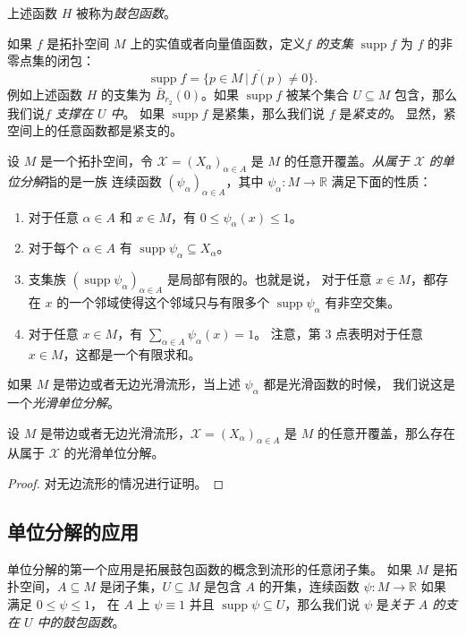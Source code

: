 \documentclass[fontset=none]{Notes}
\DeclareMathOperator\supp{supp}
\begin{document}
上述函数 $H$ 被称为\emph{鼓包函数}。

如果 $f$ 是拓扑空间 $M$ 上的实值或者向量值函数，定义\emph{$f$ 的支集}
$\supp f$ 为 $f$ 的非零点集的闭包：
\[
  \supp f=\overline{\{p\in M\,|\, f(p)\neq 0\}}  .
\]
例如上述函数 $H$ 的支集为 $\bar B_{r_2}(0)$。如果 $\supp f$
被某个集合 $U\subseteq M$ 包含，那么我们说\emph{$f$ 支撑在 $U$ 中}。
如果 $\supp f$ 是紧集，那么我们说 $f$ 是\emph{紧支的}。
显然，紧空间上的任意函数都是紧支的。

设 $M$ 是一个拓扑空间，令 $\mathcal{X}=(X_\alpha)_{\alpha\in A}$ 是
$M$ 的任意开覆盖。\emph{从属于 $\mathcal{X}$ 的单位分解}指的是一族
连续函数 $(\psi_\alpha)_{\alpha\in A}$，其中 $\psi_\alpha:M\to\mathbb{R}$
满足下面的性质：
\begin{enumerate}
  \item 对于任意 $\alpha\in A$ 和 $x\in M$，有 $0\leq\psi_\alpha(x)\leq 1$。
  \item 对于每个 $\alpha\in A$ 有 $\supp\psi_\alpha\subseteq X_\alpha$。
  \item 支集族 $(\supp\psi_\alpha)_{\alpha\in A}$ 是局部有限的。也就是说，
  对于任意 $x\in M$，都存在 $x$ 的一个邻域使得这个邻域只与有限多个
  $\supp\psi_\alpha$ 有非空交集。
  \item 对于任意 $x\in M$，有 $\sum_{\alpha\in A}\psi_\alpha(x)=1$。
  注意，第 3 点表明对于任意 $x\in M$，这都是一个有限求和。
\end{enumerate}
如果 $M$ 是带边或者无边光滑流形，当上述 $\psi_\alpha$ 都是光滑函数的时候，
我们说这是一个\emph{光滑单位分解}。

\begin{theorem}[单位分解的存在性]
  设 $M$ 是带边或者无边光滑流形，$\mathcal{X}=(X_\alpha)_{\alpha\in A}$ 是
  $M$ 的任意开覆盖，那么存在从属于 $\mathcal{X}$ 的光滑单位分解。
\end{theorem}
\begin{proof}
  对无边流形的情况进行证明。
\end{proof}

\subsection{单位分解的应用}

单位分解的第一个应用是拓展鼓包函数的概念到流形的任意闭子集。
如果 $M$ 是拓扑空间，$A\subseteq M$ 是闭子集，$U\subseteq M$ 是包含 $A$
的开集，连续函数 $\psi:M\to\mathbb{R}$ 如果满足 $0\leq \psi\leq 1$，
在 $A$ 上 $\psi\equiv 1$ 并且 $\supp \psi\subseteq U$，那么我们说
$\psi$ 是\emph{关于 $A$ 的支在 $U$ 中的鼓包函数}。
\end{document}
